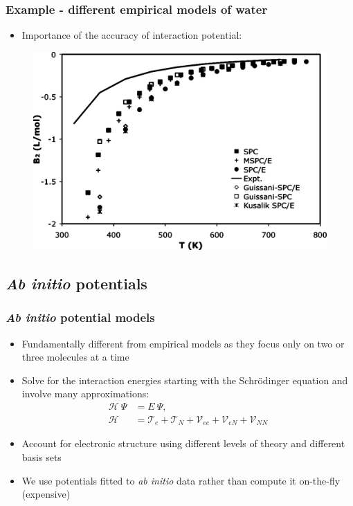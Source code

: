\documentclass[xcolor=svgnames]{beamer}
\DeclareRobustCommand{\abinitio}[0]{\emph{ab initio}}
\DeclareRobustCommand{\Abinitio}[0]{\emph{Ab initio}}
\DeclareRobustCommand{\Schrodinger}[0]{Schr\"{o}dinger}
\DeclareRobustCommand{\mc}[1]{\mathcal{#1}}
\begin{document}
		\begin{frame}
			\frametitle{Example - different empirical models of water}
            \begin{itemize}
                \item Importance of the accuracy of interaction potential:
            \end{itemize}
            \begin{figure}
            \centering
            \includegraphics[scale=0.08,keepaspectratio]{ben2a.png}
            \end{figure}
		\end{frame}
    \subsection{\Abinitio{} potentials}
        \begin{frame}
        \frametitle{\Abinitio{} potential models}
            \begin{itemize}
                \item Fundamentally different from empirical models as they focus only on two or three molecules at a time
                \item Solve for the interaction energies starting with the \Schrodinger{} equation and involve many approximations:
                \begin{equation*}
                    \begin{aligned}
                        \mc{H}~\Psi &= E~\Psi, \\
                        \mc{H} &= \mc{T}_e + \mc{T}_N + \mc{V}_{ee} + \mc{V}_{eN} + \mc{V}_{NN}
                    \end{aligned}
                \end{equation*}
                \item Account for electronic structure using different levels of theory and different basis sets
                \item We use potentials fitted to \abinitio{} data rather than compute it on-the-fly (expensive)
            \end{itemize}
            \end{frame}
\end{document}
